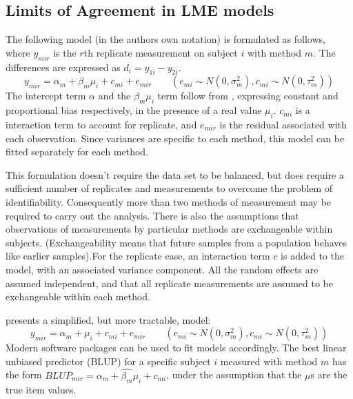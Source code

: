 \documentclass[12pt, a4paper]{report}
\theoremstyle{plain}
\theoremstyle{definition}
\theoremstyle{remark}
\begin{document}
\subsection{Limits of Agreement in LME models}



The following model (in the authors own notation) is
formulated as follows, where $y_{mir}$ is the $r$th replicate
measurement on subject $i$ with method $m$. The differences are expressed as $d_{i} = y_{1i} - y_{2i}$.
\begin{equation}
y_{mir}  = \alpha_{m} + \beta_{m}\mu_{i} + c_{mi} + e_{mir} \qquad
( e_{mi} \sim N(0,\sigma^{2}_{m}), c_{mi} \sim N(0,\tau^{2}_{m}))
\end{equation}
The intercept term $\alpha$ and the $\beta_{m}\mu_{i}$ term follow from \citet{DunnSEME}, expressing constant and proportional bias
respectively, in the presence of a real value $\mu_{i}$. $c_{mi}$ is a interaction term to account for replicate, and $e_{mir}$ is the residual associated with each observation. Since variances are specific to each method, this model can be
fitted separately for each method.

This formulation doesn't require the data set to be balanced, but does require a sufficient number of replicates
and measurements to overcome the problem of identifiability. Consequently more than two methods of measurement may
be required to carry out the analysis. There is also the assumptions that observations of measurements by particular methods are exchangeable within subjects. (Exchangeability means that future samples from a population behaves like earlier
samples).For the replicate case, an interaction term $c$ is added to the model, with an associated variance component. All the random effects are assumed independent, and that all replicate measurements are assumed to be exchangeable within each method. 

\citet{BXC2008} presents a simplified, but more tractable, model:
\begin{equation}
y_{mir}  = \alpha_{m} + \mu_{i} + c_{mi} + e_{mir} \qquad ( e_{mi}
\sim N(0,\sigma^{2}_{m}), c_{mi} \sim N(0,\tau^{2}_{m}))
\end{equation}
Modern software packages can be used to fit models accordingly. The best linear unbiased predictor (BLUP) for a specific subject $i$ measured with method $m$ has the form $BLUP_{mir} = \hat{\alpha_{m}} +
\hat{\beta_{m}}\mu_{i} + c_{mi}$, under the assumption that the
$\mu$s are the true item values.
\end{document}
